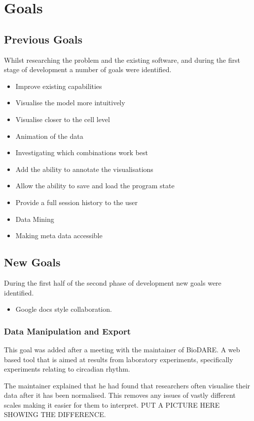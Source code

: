 \section{Goals}

\subsection{Previous Goals}
Whilst researching the problem and the existing software, and during the first stage of development a number of goals were identified.

\begin{itemize}
\item Improve existing capabilities
\item Visualise the model more intuitively
\item Visualise closer to the cell level
\item Animation of the data
\item Investigating which combinations work best
\item Add the ability to annotate the visualisations
\item Allow the ability to save and load the program state
\item Provide a full session history to the user
\item Data Mining
\item Making meta data accessible
\end{itemize}

\subsection{New Goals}
During the first half of the second phase of development new goals were identified.

\begin{itemize}
\item Google docs style collaboration.
\end{itemize}

\subsubsection{Data Manipulation and Export}

This goal was added after a meeting with the maintainer of BioDARE.  A web based tool that is aimed at results from laboratory experiments, specifically experiments relating to circadian rhythm.

The maintainer explained that he had found that researchers often visualise their data after it has been normalised.  This removes any issues of vastly different scales making it easier for them to interpret. PUT A PICTURE HERE SHOWING THE DIFFERENCE.

